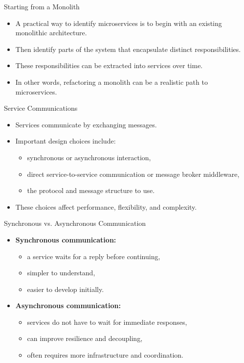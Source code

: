 \begin{frame}{Starting from a Monolith}
\begin{itemize}
    \item A practical way to identify microservices is to begin with an existing monolithic architecture.
    \item Then identify parts of the system that encapsulate distinct responsibilities.
    \item These responsibilities can be extracted into services over time.
    \item In other words, refactoring a monolith can be a realistic path to microservices.
\end{itemize}
\end{frame}

\begin{frame}{Service Communications}
\begin{itemize}
    \item Services communicate by exchanging messages.
    \item Important design choices include:
    \begin{itemize}
        \item synchronous or asynchronous interaction,
        \item direct service-to-service communication or message broker middleware,
        \item the protocol and message structure to use.
    \end{itemize}
    \item These choices affect performance, flexibility, and complexity.
\end{itemize}
\end{frame}

\begin{frame}{Synchronous vs. Asynchronous Communication}
\begin{itemize}
    \item \textbf{Synchronous communication:}
    \begin{itemize}
        \item a service waits for a reply before continuing,
        \item simpler to understand,
        \item easier to develop initially.
    \end{itemize}
    \item \textbf{Asynchronous communication:}
    \begin{itemize}
        \item services do not have to wait for immediate responses,
        \item can improve resilience and decoupling,
        \item often requires more infrastructure and coordination.
    \end{itemize}
\end{itemize}
\end{frame}

